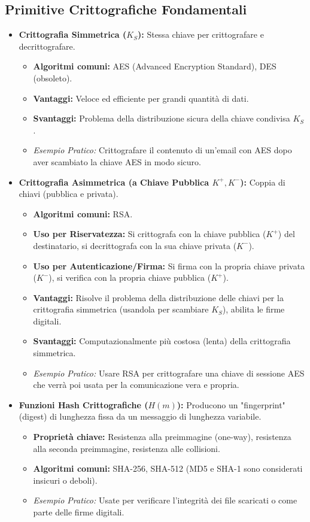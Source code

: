 \subsection{Primitive Crittografiche Fondamentali}
\begin{itemize}
    \item \textbf{Crittografia Simmetrica ($K_S$):} Stessa chiave per crittografare e decrittografare.
    \begin{itemize}
        \item \textbf{Algoritmi comuni:} AES (Advanced Encryption Standard), DES (obsoleto).
        \item \textbf{Vantaggi:} Veloce ed efficiente per grandi quantità di dati.
        \item \textbf{Svantaggi:} Problema della distribuzione sicura della chiave condivisa $K_S$.
        \item \emph{Esempio Pratico:} Crittografare il contenuto di un'email con AES dopo aver scambiato la chiave AES in modo sicuro.
    \end{itemize}

    \item \textbf{Crittografia Asimmetrica (a Chiave Pubblica $K^+, K^-$):} Coppia di chiavi (pubblica e privata).
    \begin{itemize}
        \item \textbf{Algoritmi comuni:} RSA.
        \item \textbf{Uso per Riservatezza:} Si crittografa con la chiave pubblica ($K^+$) del destinatario, si decrittografa con la sua chiave privata ($K^-$).
        \item \textbf{Uso per Autenticazione/Firma:} Si firma con la propria chiave privata ($K^-$), si verifica con la propria chiave pubblica ($K^+$).
        \item \textbf{Vantaggi:} Risolve il problema della distribuzione delle chiavi per la crittografia simmetrica (usandola per scambiare $K_S$), abilita le firme digitali.
        \item \textbf{Svantaggi:} Computazionalmente più costosa (lenta) della crittografia simmetrica.
        \item \emph{Esempio Pratico:} Usare RSA per crittografare una chiave di sessione AES che verrà poi usata per la comunicazione vera e propria.
    \end{itemize}

    \item \textbf{Funzioni Hash Crittografiche ($H(m)$):} Producono un "fingerprint" (digest) di lunghezza fissa da un messaggio di lunghezza variabile.
    \begin{itemize}
        \item \textbf{Proprietà chiave:} Resistenza alla preimmagine (one-way), resistenza alla seconda preimmagine, resistenza alle collisioni.
        \item \textbf{Algoritmi comuni:} SHA-256, SHA-512 (MD5 e SHA-1 sono considerati insicuri o deboli).
        \item \emph{Esempio Pratico:} Usate per verificare l'integrità dei file scaricati o come parte delle firme digitali.
    \end{itemize}


\end{itemize}
